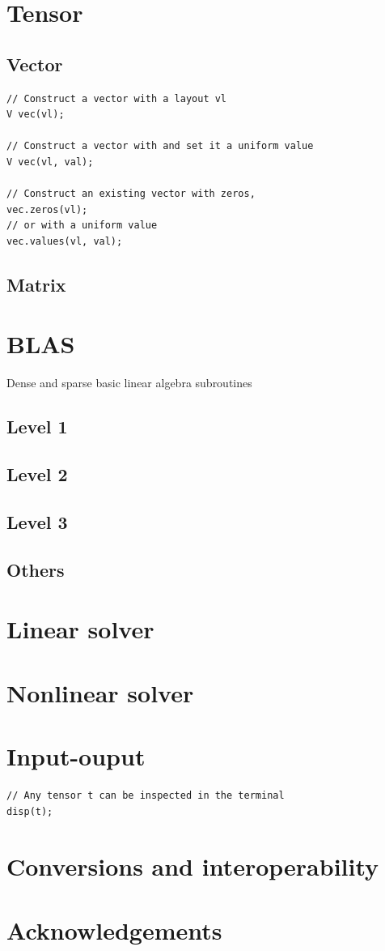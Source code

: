 \documentclass[a4paper,landscape,columns=3]{cheatsheet} %
\begin{document}
\section{Tensor}
\subsection{Vector}
\begin{lstlisting}
// Construct a vector with a layout vl
V vec(vl);

// Construct a vector with and set it a uniform value
V vec(vl, val);

// Construct an existing vector with zeros,
vec.zeros(vl);
// or with a uniform value
vec.values(vl, val);

\end{lstlisting}
\subsection{Matrix}

\section{BLAS}
Dense and sparse basic linear algebra subroutines
\subsection{Level 1}

\subsection{Level 2}

\subsection{Level 3}

\subsection{Others}


\section{Linear solver}


\section{Nonlinear solver}

\section{Input-ouput}
\begin{lstlisting}
// Any tensor t can be inspected in the terminal
disp(t);
\end{lstlisting}


\section{Conversions and interoperability}


\section{Acknowledgements}
\cite{utopiagit}



\end{document}

